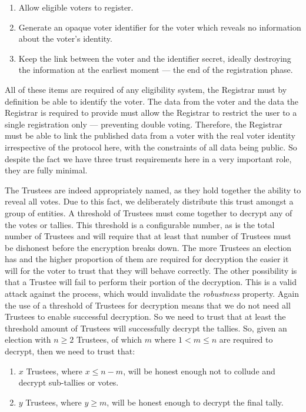 \begin{enumerate}
    \item Allow eligible voters to register.
    \item Generate an opaque voter identifier for the voter which reveals no information about the voter's identity.
    \item Keep the link between the voter and the identifier secret, ideally destroying the information at the earliest moment --- the end of the registration phase.
\end{enumerate}

All of these items are required of any eligibility system, the Registrar must by definition be able to identify the voter. The data from the voter and the data the Registrar is required to provide must allow the Registrar to restrict the user to a single registration only --- preventing double voting. Therefore, the Registrar must be able to link the published data from a voter with the real voter identity irrespective of the protocol here, with the constraints of all data being public. So despite the fact we have three trust requirements here in a very important role, they are fully minimal.

The Trustees are indeed appropriately named, as they hold together the ability to reveal all votes. Due to this fact, we deliberately distribute this trust amongst a group of entities. A threshold of Trustees must come together to decrypt any of the votes or tallies. This threshold is a configurable number, as is the total number of Trustees and will require that at least that number of Trustees must be dishonest before the encryption breaks down. The more Trustees an election has and the higher proportion of them are required for decryption the easier it will for the voter to trust that they will behave correctly. The other possibility is that a Trustee will fail to perform their portion of the decryption. This is a valid attack against the process, which would invalidate the \emph{robustness} property. Again the use of a threshold of Trustees for decryption means that we do not need all Trustees to enable successful decryption. So we need to trust that at least the threshold amount of Trustees will successfully decrypt the tallies. So, given an election with $n \geq 2$ Trustees, of which $m$ where $1 < m \leq n$ are required to decrypt, then we need to trust that:

\begin{enumerate}
    \item $x$ Trustees, where $x \leq n - m$, will be honest enough not to collude and decrypt sub-tallies or votes.
    \item $y$ Trustees, where $y \geq m$, will be honest enough to decrypt the final tally.
\end{enumerate}

